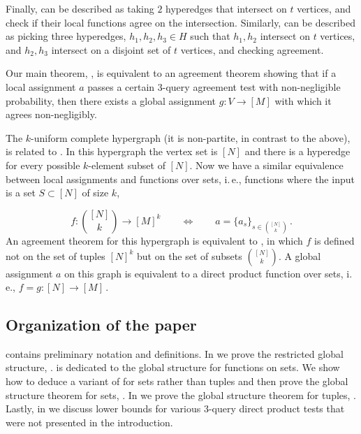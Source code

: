\documentclass[11pt]{article}
\numberwithin{equation}{section}
\theoremstyle{definition}
\theoremstyle{plain}
\newcommand{\ie}{i.\,e.}
\newcommand{\set}[1]{\{#1\}} %
\newcommand\f{f} %
\newcommand\pf{g} %
\begin{document}
Finally,  can be described as taking $2$ hyperedges that intersect on $t$ vertices, and check if their local functions agree on the intersection. Similarly,  can be described as picking three hyperedges, $h_1,h_2,h_3\in H$ such that $h_1,h_2$ intersect on $t$ vertices, and $h_2,h_3$ intersect on a disjoint set of $t$ vertices, and checking agreement.
	
Our main theorem, , is equivalent to an agreement theorem showing that if a local assignment $a$ passes a certain 3-query agreement test with non-negligible probability, then there exists a global assignment $\pf:V\rightarrow[M]$ with which it agrees non-negligibly.
	
The $k$-uniform complete hypergraph (it is non-partite, in contrast to the above), is related to . In this hypergraph the vertex set is $[N]$ and there is a hyperedge for every possible $k$-element subset of $[N]$. Now we have a similar equivalence between local assignments and functions over sets, \ie, functions where the input is a set $S\subset[N]$ of size $k$,
	
\[ f:\binom{[N]}k\to[M]^k \qquad \Longleftrightarrow \qquad a = \set{a_s}_{s\in\binom{[N]}k}\,. %
\]
%
An agreement theorem for this hypergraph is equivalent to , in which $\f$ is defined not on
%
%
%
%
%
the set of tuples $[N]^k$ but on the set of subsets $\binom {[N]} k$. %
A global assignment $a$ %
on this graph  %
%
is equivalent to a direct product function over sets, \ie, $\f=\pf:[N]\rightarrow[M]$\,.

\subsection{Organization of the paper}
 contains preliminary %
notation  %
and definitions. In  we prove the restricted global structure, .
 is dedicated to the global structure for functions on sets. We show how to deduce a variant of  for sets rather than tuples and then prove the global structure theorem for sets, . In  we prove the global structure theorem for tuples, .
Lastly, in  we discuss lower bounds for various 3-query direct product tests that were not presented in the introduction.
\end{document}
